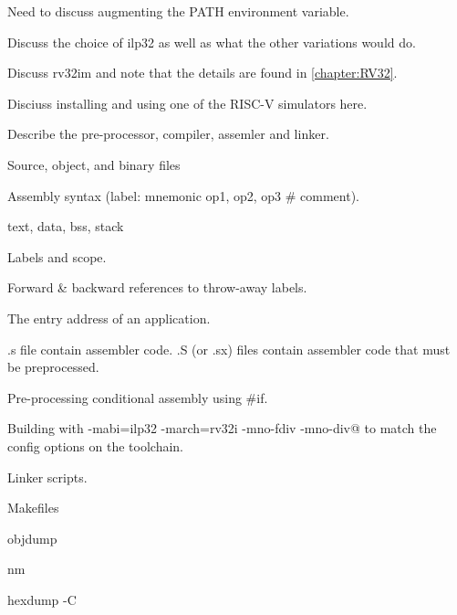 Need to discuss augmenting the PATH environment variable.

Discuss the choice of ilp32 as well as what the other variations would do.

Discuss rv32im and note that the details are found in \autoref{chapter:RV32}.

Disciuss installing and using one of the RISC-V simulators 
here.

Describe the pre-processor, compiler, assemler and linker.

Source, object, and binary files

Assembly syntax (label: mnemonic op1, op2, op3  \# comment).

text, data, bss, stack

Labels and scope.

Forward \& backward references to throw-away labels.

The entry address of an application.

.s file contain assembler code.
.S (or .sx) files contain assembler code that must be preprocessed.~\cite[p.~29]{gcc:2017}

Pre-processing conditional assembly using \#if.

Building with \verb@-mabi=ilp32 -march=rv32i -mno-fdiv -mno-div@ to match
the config options on the toolchain.  

Linker scripts.

Makefiles

objdump

nm

hexdump -C
